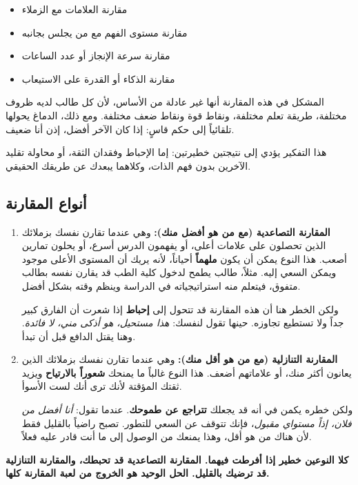 \documentclass[12pt,a4paper]{book}
\newcommand{\importantAr}[1]{%
	\begin{important}
		\bfseries #1
	\end{important}
}
\begin{document}
	\begin{itemize}
		\item مقارنة العلامات مع الزملاء
		\item مقارنة مستوى الفهم مع من يجلس بجانبه
		\item مقارنة سرعة الإنجاز أو عدد الساعات
		\item مقارنة الذكاء أو القدرة على الاستيعاب
	\end{itemize}
	
	المشكل في هذه المقارنة أنها غير عادلة من الأساس، لأن كل طالب لديه ظروف مختلفة، طريقة تعلم مختلفة، ونقاط قوة ونقاط ضعف مختلفة. ومع ذلك، الدماغ يحولها تلقائياً إلى حكم قاسٍ: إذا كان الآخر أفضل، إذن أنا ضعيف.
	
	هذا التفكير يؤدي إلى نتيجتين خطيرتين: إما الإحباط وفقدان الثقة، أو محاولة تقليد الآخرين بدون فهم الذات، وكلاهما يبعدك عن طريقك الحقيقي.
	
	\subsection{أنواع المقارنة}
	
	\begin{enumerate}
		\item \textbf{المقارنة التصاعدية (مع من هو أفضل منك):} 
		وهي عندما تقارن نفسك بزملائك الذين تحصلون على علامات أعلى، أو يفهمون الدرس أسرع، أو يحلون تمارين أصعب. هذا النوع يمكن أن يكون \textbf{ملهماً} أحياناً، لأنه يريك أن المستوى الأعلى موجود ويمكن السعي إليه. مثلاً، طالب يطمح لدخول كلية الطب قد يقارن نفسه بطالب متفوق، فيتعلم منه استراتيجياته في الدراسة وينظم وقته بشكل أفضل.
		
		ولكن الخطر هنا أن هذه المقارنة قد تتحول إلى \textbf{إحباط} إذا شعرت أن الفارق كبير جداً ولا تستطيع تجاوزه. حينها تقول لنفسك: \textit{هذا مستحيل، هو أذكى مني، لا فائدة}. وهنا يقتل الدافع قبل أن تبدأ.
		
		\item \textbf{المقارنة التنازلية (مع من هو أقل منك):}
		وهي عندما تقارن نفسك بزملائك الذين يعانون أكثر منك، أو علاماتهم أضعف. هذا النوع غالباً ما يمنحك \textbf{شعوراً بالارتياح} ويزيد ثقتك المؤقتة لأنك ترى أنك لست الأسوأ.
		
		ولكن خطره يكمن في أنه قد يجعلك \textbf{تتراجع عن طموحك}. عندما تقول: \textit{أنا أفضل من فلان، إذاً مستواي مقبول}، فإنك تتوقف عن السعي للتطور. تصبح راضياً بالقليل فقط لأن هناك من هو أقل، وهذا يمنعك من الوصول إلى ما أنت قادر عليه فعلاً.
	\end{enumerate}
	
	\importantAr{كلا النوعين خطير إذا أفرطت فيهما. المقارنة التصاعدية قد تحبطك، والمقارنة التنازلية قد ترضيك بالقليل. الحل الوحيد هو الخروج من لعبة المقارنة كلها.}
	
\end{document}
